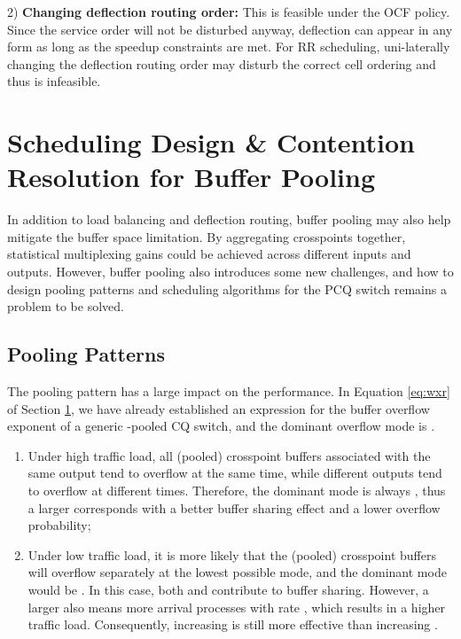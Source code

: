 \documentclass[journal,final,doublecolumn,10pt,twoside]{IEEEtranTCOM} \normalsize
\begin{document}
2) \textbf{Changing deflection routing order:} This is feasible under the OCF policy. Since the service order will not be disturbed anyway, deflection can appear in any form as long as the speedup constraints are met. For RR scheduling, uni-laterally changing the deflection routing order may disturb the correct cell ordering and thus is infeasible.

\section{Scheduling Design \& Contention Resolution for Buffer Pooling}
\label{sec:pooling}

In addition to load balancing and deflection routing, buffer pooling may also help mitigate the buffer space limitation. By aggregating crosspoints together, statistical multiplexing gains could be achieved across different inputs and outputs. However, buffer pooling also introduces some new challenges, and how to design pooling patterns and scheduling algorithms for the PCQ switch remains a problem to be solved.

\subsection{Pooling Patterns}

The pooling pattern has a large impact on the performance. In Equation \ref{eq:wxr} of Section \ref{sec:pooling}, we have already established an expression for the buffer overflow exponent  of a generic -pooled CQ switch, and the dominant overflow mode is .

\begin{enumerate}
\item Under high traffic load, all (pooled) crosspoint buffers associated with the same output tend to overflow at the same time, while different outputs tend to overflow at different times. Therefore, the dominant mode is always , thus a larger  corresponds with a better buffer sharing effect and a lower overflow probability;

\item Under low traffic load, it is more likely that the (pooled) crosspoint buffers will overflow separately at the lowest possible mode, and the dominant mode would be . In this case, both  and  contribute to buffer sharing. However, a larger  also means more arrival processes with rate , which results in a higher traffic load. Consequently, increasing  is still more effective than increasing .
\end{enumerate}
\end{document}
